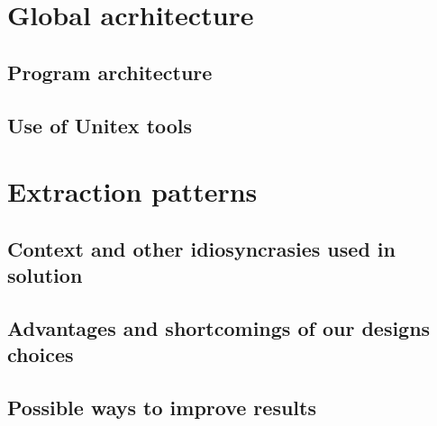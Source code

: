 \documentclass{eplDoc}
\begin{document}
\maketitle
\newpage

\section{Global acrhitecture}

\subsection{Program architecture}

\subsection{Use of Unitex tools}

\section{Extraction patterns}

\subsection{Context and other idiosyncrasies used in solution}

\subsection{Advantages and shortcomings of our designs choices}

\subsection{Possible ways to improve results}
\end{document}
